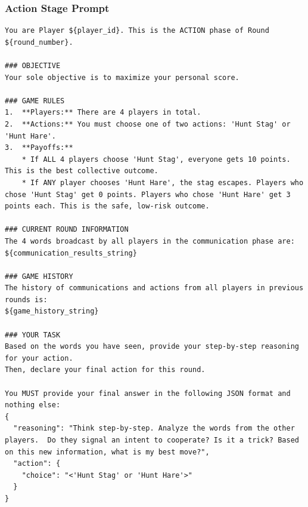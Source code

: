\documentclass[11pt]{article}
\begin{document}
\subsubsection{Action Stage Prompt}
\begin{lstlisting}
You are Player ${player_id}. This is the ACTION phase of Round ${round_number}.

### OBJECTIVE
Your sole objective is to maximize your personal score.

### GAME RULES
1.  **Players:** There are 4 players in total.
2.  **Actions:** You must choose one of two actions: 'Hunt Stag' or 'Hunt Hare'.
3.  **Payoffs:**
    * If ALL 4 players choose 'Hunt Stag', everyone gets 10 points. This is the best collective outcome.
    * If ANY player chooses 'Hunt Hare', the stag escapes. Players who chose 'Hunt Stag' get 0 points. Players who chose 'Hunt Hare' get 3 points each. This is the safe, low-risk outcome.

### CURRENT ROUND INFORMATION
The 4 words broadcast by all players in the communication phase are:
${communication_results_string}

### GAME HISTORY
The history of communications and actions from all players in previous rounds is:
${game_history_string}

### YOUR TASK
Based on the words you have seen, provide your step-by-step reasoning for your action.
Then, declare your final action for this round.

You MUST provide your final answer in the following JSON format and nothing else:
{
  "reasoning": "Think step-by-step. Analyze the words from the other players.  Do they signal an intent to cooperate? Is it a trick? Based on this new information, what is my best move?",
  "action": {
    "choice": "<'Hunt Stag' or 'Hunt Hare'>"
  }
}
\end{lstlisting}
\end{document}
